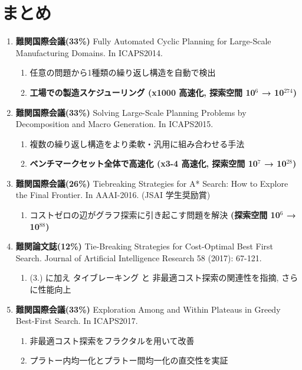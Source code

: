 \section{まとめ}
\label{sec:orgheadline47}

\begin{smaller}
\begin{enumerate}
\item \textbf{難関国際会議(33\%)} Fully Automated Cyclic Planning for Large-Scale Manufacturing Domains. In ICAPS2014.
\begin{enumerate}
\item 任意の問題から1種類の繰り返し構造を自動で検出
\item \textbf{工場での製造スケジューリング (x1000 高速化, 探索空間 10\(^{\text{6}}\) → 10\(^{\text{274}}\))}
\end{enumerate}
\item \textbf{難関国際会議(33\%)} Solving Large-Scale Planning Problems by Decomposition and Macro Generation. In ICAPS2015.
\begin{enumerate}
\item 複数の繰り返し構造をより柔軟・汎用に組み合わせる手法
\item \textbf{ベンチマークセット全体で高速化 (x3-4 高速化, 探索空間 10\(^{\text{7}}\) → 10\(^{\text{28}}\))}
\end{enumerate}
\item \textbf{難関国際会議(26\%)} Tiebreaking Strategies for A* Search: How to Explore the Final Frontier. In AAAI-2016. (JSAI 学生奨励賞)
\begin{enumerate}
\item コストゼロの辺がグラフ探索に引き起こす問題を解決 \textbf{(探索空間 10\(^{\text{6}}\) → 10\(^{\text{88}}\))}
\end{enumerate}
\item \textbf{難関論文誌(12\%)}   Tie-Breaking Strategies for Cost-Optimal Best First Search. Journal of Artificial Intelligence Research 58 (2017): 67-121.
\begin{enumerate}
\item (3.) に加え タイブレーキング と 非最適コスト探索の関連性を指摘, さらに性能向上
\end{enumerate}
\item \textbf{難関国際会議(33\%)} Exploration Among and Within Plateaus in Greedy Best-First Search. In ICAPS2017.
\begin{enumerate}
\item 非最適コスト探索をフラクタルを用いて改善
\item プラトー内均一化とプラトー間均一化の直交性を実証

\end{enumerate}
\end{enumerate}
\end{smaller}
